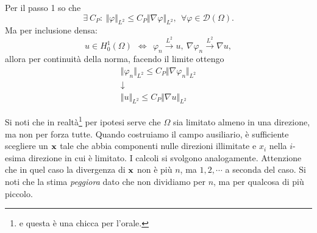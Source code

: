 \begin{dimostrazione}
    Per il passo 1 so che
    \begin{equation*}
        \exists \ C_{P} :\ \Vert \varphi \Vert _{L^{2}} \leqslant C_{P}\Vert \nabla \varphi \Vert _{L^{2}} ,\ \ \forall \varphi \in \mathcal{D}(\Omega) .
    \end{equation*}
    Ma per inclusione densa:
    \begin{equation*}
        u\in H_{0}^{1}(\Omega) \ \ \Leftrightarrow \ \ \varphi _{n}\xrightarrow{L^{2}} u,\ \nabla \varphi _{n}\xrightarrow{L^{2}} \nabla u,
    \end{equation*}
    allora per continuità della norma, facendo il limite ottengo
    \begin{gather*}
        \Vert \varphi _{n}\Vert _{L^{2}} \leqslant C_{P}\Vert \nabla \varphi _{n}\Vert _{L^{2}}\\
        \downarrow \\
        \Vert u\Vert _{L^{2}} \leqslant C_{P}\Vert \nabla u\Vert _{L^{2}}
    \end{gather*}
\end{dimostrazione}
Si noti che in realtà\footnote{e questa è una chicca per l'orale.} per ipotesi serve che $\Omega$ sia limitato almeno in una direzione, ma non per forza tutte. Quando costruiamo il campo ausiliario, è sufficiente scegliere un $\mathbf{x}$ tale che abbia componenti nulle direzioni illimitate e $x_{i}$ nella $i$-esima direzione in cui è limitato. I calcoli si svolgono analogamente. Attenzione che in quel caso la divergenza di $\mathbf{x}$ non è più $n$, ma $1,2, \cdots $ a seconda del caso. Si noti che la stima \emph{peggiora} dato che non dividiamo per $n$, ma per qualcosa di più piccolo.

